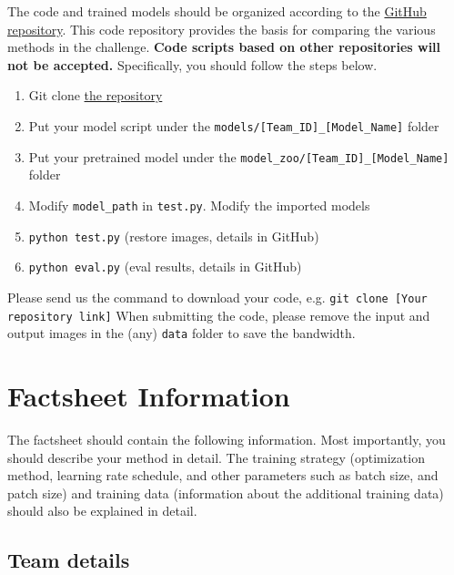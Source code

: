 \documentclass[10pt,twocolumn,letterpaper]{article}
\begin{document}
The code and trained models should be organized according to the \href{https://github.com/zhengchen1999/NTIRE2025_ImageSR_x4}{GitHub repository}. This code repository provides the basis for comparing the various methods in the challenge. \textbf{Code scripts based on other repositories will not be accepted.} Specifically, you should follow the steps below.
\begin{enumerate}
    \item Git clone \href{https://github.com/zhengchen1999/NTIRE2025_ImageSR_x4}{the repository}
    \item Put your model script under the \texttt{models/[Team\_ID]\_[Model\_Name]} folder
    \item Put your pretrained model under the \texttt{model\_zoo/[Team\_ID]\_[Model\_Name]} folder
    \item Modify \texttt{model\_path} in \texttt{test.py}. Modify the imported models
    \item \texttt{python test.py} (restore images, details in GitHub)
    \item \texttt{python eval.py} (eval results, details in GitHub)
\end{enumerate}
Please send us the command to download your code, e.g. \texttt{git clone [Your repository link]}
When submitting the code, please remove the input and output images in the (any) \texttt{data} folder to save the bandwidth.

\section{Factsheet Information}

The factsheet should contain the following information. Most importantly, you should describe your method in detail. The training strategy (optimization method, learning rate schedule, and other parameters such as batch size, and patch size) and training data (information about the additional training data) should also be explained in detail.

\subsection{Team details}
\end{document}
